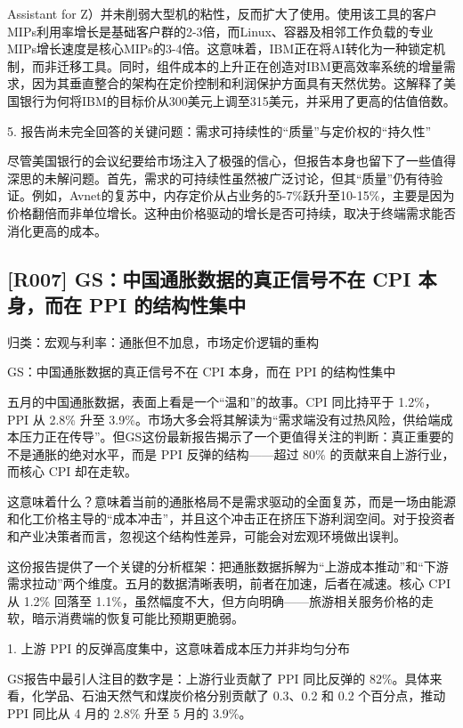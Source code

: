 \documentclass[11pt]{ctexart}
\begin{document}
 Assistant for Z）并未削弱大型机的粘性，反而扩大了使用。使用该工具的客户MIPs利用率增长是基础客户群的2-3倍，而Linux、容器及相邻工作负载的专业MIPs增长速度是核心MIPs的3-4倍。这意味着，IBM正在将AI转化为一种锁定机制，而非迁移工具。同时，组件成本的上升正在创造对IBM更高效率系统的增量需求，因为其垂直整合的架构在定价控制和利润保护方面具有天然优势。这解释了美国银行为何将IBM的目标价从300美元上调至315美元，并采用了更高的估值倍数。

5. 报告尚未完全回答的关键问题：需求可持续性的“质量”与定价权的“持久性”

尽管美国银行的会议纪要给市场注入了极强的信心，但报告本身也留下了一些值得深思的未解问题。首先，需求的可持续性虽然被广泛讨论，但其“质量”仍有待验证。例如，Avnet的复苏中，内存定价从占业务的5-7\%跃升至10-15\%，主要是因为价格翻倍而非单位增长。这种由价格驱动的增长是否可持续，取决于终端需求能否消化更高的成本。

\subsection{[R007] GS：中国通胀数据的真正信号不在 CPI 本身，而在 PPI 的结构性集中}
{\small\color{refgray}归类：宏观与利率：通胀但不加息，市场定价逻辑的重构}

GS：中国通胀数据的真正信号不在 CPI 本身，而在 PPI 的结构性集中

五月的中国通胀数据，表面上看是一个“温和”的故事。CPI 同比持平于 1.2\%，PPI 从 2.8\% 升至 3.9\%。市场大多会将其解读为“需求端没有过热风险，供给端成本压力正在传导”。但GS这份最新报告揭示了一个更值得关注的判断：真正重要的不是通胀的绝对水平，而是 PPI 反弹的结构——超过 80\% 的贡献来自上游行业，而核心 CPI 却在走软。

这意味着什么？意味着当前的通胀格局不是需求驱动的全面复苏，而是一场由能源和化工价格主导的“成本冲击”，并且这个冲击正在挤压下游利润空间。对于投资者和产业决策者而言，忽视这个结构性差异，可能会对宏观环境做出误判。

这份报告提供了一个关键的分析框架：把通胀数据拆解为“上游成本推动”和“下游需求拉动”两个维度。五月的数据清晰表明，前者在加速，后者在减速。核心 CPI 从 1.2\% 回落至 1.1\%，虽然幅度不大，但方向明确——旅游相关服务价格的走软，暗示消费端的恢复可能比预期更脆弱。

1. 上游 PPI 的反弹高度集中，这意味着成本压力并非均匀分布

GS报告中最引人注目的数字是：上游行业贡献了 PPI 同比反弹的 82\%。具体来看，化学品、石油天然气和煤炭价格分别贡献了 0.3、0.2 和 0.2 个百分点，推动 PPI 同比从 4 月的 2.8\% 升至 5 月的 3.9\%。
\end{document}
